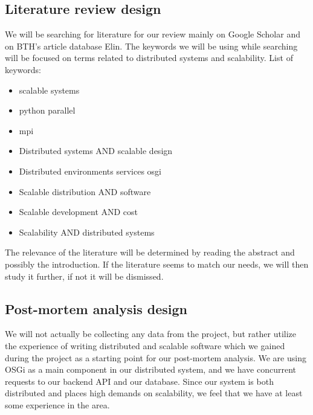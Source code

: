 \documentclass{article}
\begin{document}
\subsection{Literature review design}
We will be searching for literature for our review mainly on Google Scholar and
on BTH's article database Elin. The keywords we will be using while searching 
will be focused on terms related to distributed systems and scalability.
\newline
List of keywords:
\begin{itemize}
\item{scalable systems}
\item{python parallel}
\item{mpi}
\item{Distributed systems AND scalable design}
\item{Distributed environments services osgi}
\item{Scalable distribution AND software}
\item{Scalable development AND cost}
\item{Scalability AND distributed systems}
\end{itemize}

The relevance of the literature will be determined by reading the abstract and
possibly the introduction. If the literature seems to match our needs, we will
then study it further, if not it will be dismissed.

\subsection{Post-mortem analysis design}
 
We will not actually be collecting any data from the project, but rather
utilize the experience of writing distributed and scalable software which we
gained during the project as a starting point for our post-mortem analysis. We
are using OSGi \cite{marples2001open} as a main component in our distributed
system, and we have concurrent requests to our backend API and our database.
Since our system is both distributed and places high demands on scalability, we
feel that we have at least some experience in the area.




 
\end{document}
